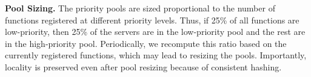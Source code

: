 
  



\noindent \textbf{Pool Sizing.}
The priority pools are sized proportional to the number of functions registered at different priority levels.
Thus, if 25\% of all functions are low-priority, then 25\% of the servers are in the low-priority pool and the rest are in the high-priority pool.
Periodically, we recompute this ratio based on the currently registered functions, which may lead to resizing the pools.
Importantly, locality is preserved even after pool resizing because of consistent hashing. 

